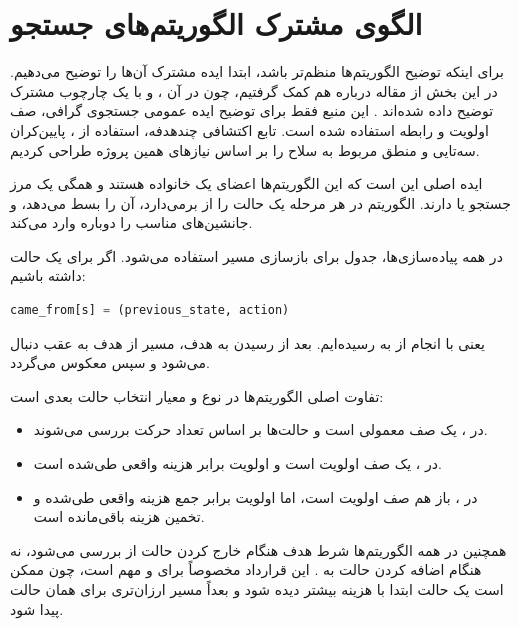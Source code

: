 \documentclass[10.5pt]{exam}
\begin{document}
\section{الگوی مشترک الگوریتم‌های جستجو}
برای اینکه توضیح الگوریتم‌ها منظم‌تر باشد، ابتدا ایده مشترک آن‌ها را توضیح می‌دهیم. در این بخش از مقاله
درباره
هم کمک گرفتیم، چون در آن
،
و
با یک چارچوب مشترک توضیح داده شده‌اند
\cite{redblobastar}.
این منبع فقط برای توضیح ایده عمومی جستجوی گرافی، صف اولویت و رابطه
استفاده شده است. تابع اکتشافی چندهدفه، استفاده از
، پایین‌کران سه‌تایی و منطق مربوط به سلاح را بر اساس نیازهای همین پروژه طراحی کردیم.

ایده اصلی این است که این الگوریتم‌ها اعضای یک خانواده هستند و همگی یک مرز جستجو یا
دارند. الگوریتم در هر مرحله یک حالت را از
برمی‌دارد، آن را بسط می‌دهد، و جانشین‌های مناسب را دوباره وارد
می‌کند.

در همه پیاده‌سازی‌ها، جدول
برای بازسازی مسیر استفاده می‌شود. اگر برای یک حالت
داشته باشیم:

\begin{latin}
\begin{lstlisting}[language=Python]
came_from[s] = (previous_state, action)
\end{lstlisting}
\end{latin}

یعنی با انجام
از
به
رسیده‌ایم. بعد از رسیدن به هدف، مسیر از هدف به عقب دنبال می‌شود و سپس معکوس می‌گردد.

تفاوت اصلی الگوریتم‌ها در نوع
و معیار انتخاب حالت بعدی است:
\begin{itemize}
    \item در
    ،
    یک صف معمولی است و حالت‌ها بر اساس تعداد حرکت بررسی می‌شوند.
    \item در
    ،
    یک صف اولویت است و اولویت برابر هزینه واقعی طی‌شده است.
    \item در
    ،
    باز هم صف اولویت است، اما اولویت برابر جمع هزینه واقعی طی‌شده و تخمین هزینه باقی‌مانده است.
\end{itemize}

همچنین در همه الگوریتم‌ها شرط هدف هنگام خارج کردن حالت از
بررسی می‌شود، نه هنگام اضافه کردن حالت به
.
این قرارداد مخصوصاً برای
و
مهم است، چون ممکن است یک حالت ابتدا با هزینه بیشتر دیده شود و بعداً مسیر ارزان‌تری برای همان حالت پیدا شود.
\end{document}
